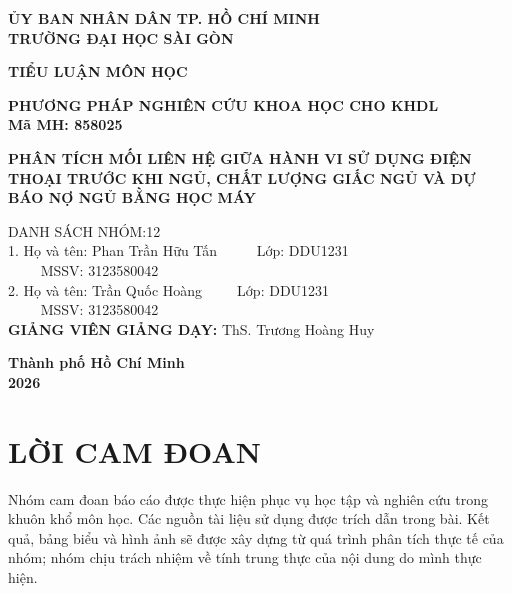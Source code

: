 \documentclass[12pt,a4paper,oneside]{report}
\begin{document}
\hypersetup{pageanchor=false}
\begin{titlepage}
\fontsize{13pt}{18pt}\selectfont
\begin{center}
{\bfseries\Large ỦY BAN NHÂN DÂN TP. HỒ CHÍ MINH\\TRƯỜNG ĐẠI HỌC SÀI GÒN}
\vspace*{2cm}

{\bfseries\huge TIỂU LUẬN MÔN HỌC}

\vspace{0.5cm}
\textbf{PHƯƠNG PHÁP NGHIÊN CỨU KHOA HỌC CHO KHDL\\Mã MH: 858025}

\vspace*{2cm}
{\bfseries\huge PHÂN TÍCH MỐI LIÊN HỆ GIỮA HÀNH VI SỬ DỤNG ĐIỆN THOẠI TRƯỚC KHI NGỦ,
CHẤT LƯỢNG GIẤC NGỦ VÀ DỰ BÁO NỢ NGỦ BẰNG HỌC MÁY}

\vspace{2.5cm}
\begin{tabbing}
		\hspace*{2cm} {\large DANH SÁCH NHÓM:12} \\		 

		\hspace*{4cm} {\large 1. Họ và tên: Phan Trần Hữu Tấn} \ \ \ \ \ Lớp: DDU1231 \\ \ \ \ \ 
        \hspace*{4cm} {\large MSSV: 3123580042}\\
		
		\hspace*{4cm} {\large 2. Họ và tên: Trần Quốc Hoàng}\ \ \ \ \ Lớp: DDU1231 \\ \ \ \ \
        \hspace*{4cm} {\large MSSV: 3123580042}\\

        \hspace{2cm}\textbf{\large GIẢNG VIÊN GIẢNG DẠY:} ThS. Trương Hoàng Huy
	\end{tabbing}    

    \vspace*{0.5cm}
	
	\begin{center}
		{\bf Thành phố Hồ Chí Minh  \\  2026}
	\end{center}
\end{center}
\newpage
\hypersetup{pageanchor=true}

\chapter*{LỜI CAM ĐOAN}
Nhóm cam đoan báo cáo được thực hiện phục vụ học tập và nghiên cứu trong khuôn khổ môn học. Các nguồn tài liệu sử dụng được trích dẫn trong bài. Kết quả, bảng biểu và hình ảnh sẽ được xây dựng từ quá trình phân tích thực tế của nhóm; nhóm chịu trách nhiệm về tính trung thực của nội dung do mình thực hiện.
\clearpage


\end{titlepage}
\end{document}
